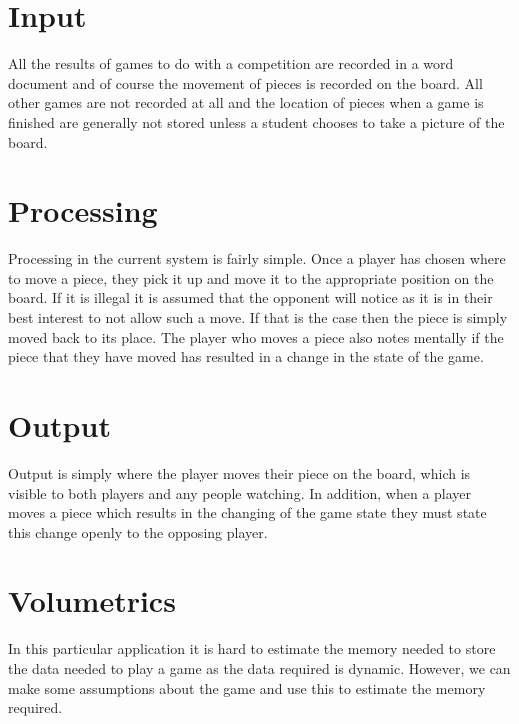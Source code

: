 \section{Input}
All the results of games to do with a competition are recorded in a word document and of course the movement of pieces is recorded on the board. All other games are not recorded at all and the location of pieces when a game is finished are generally not stored unless a student chooses to take a picture of the board.
\section{Processing}
Processing in the current system is fairly simple. Once a player has chosen where to move a piece, they pick it up and move it to the appropriate position on the board. If it is illegal it is assumed that the opponent will notice as it is in their best interest to not allow such a move. If that is the case then the piece is simply moved back to its place. The player who moves a piece also notes mentally if the piece that they have moved has resulted in a change in the state of the game.
\section{Output}
Output is simply where the player moves their piece on the board, which is visible to both players and any people watching. In addition, when a player moves a piece which results in the changing of the game state they must state this change openly to the opposing player.
\section{Volumetrics}
In this particular application it is hard to estimate the memory needed to store the data needed to play a game as the data required is dynamic. However, we can make some assumptions about the game and use this to estimate the memory required. 


